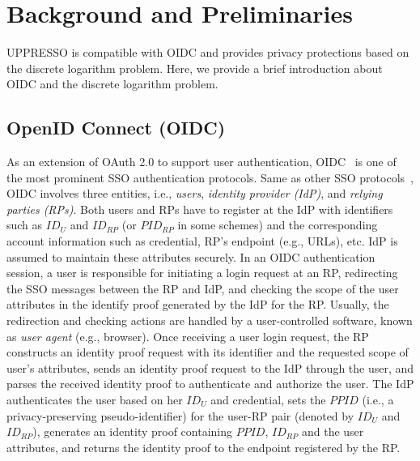 \section{Background and Preliminaries}
\label{sec:background}
UPPRESSO is compatible with OIDC and provides privacy protections based on the discrete logarithm problem.
Here, we provide a brief introduction about OIDC and the discrete logarithm problem.

\subsection{OpenID Connect (OIDC)}
\label{subsec:OIDC}
As an extension of OAuth 2.0 to support user authentication, OIDC~\cite{OpenIDConnect} is one of the most prominent SSO authentication protocols. Same as other SSO protocols~\cite{SAMLIdentifier}, OIDC involves three entities, i.e., {\em users}, {\em identity provider (IdP)}, and {\em relying parties (RPs)}.
Both users and RPs have to register at the IdP with identifiers such as $ID_U$ and $ID_{RP}$ (or $PID_{RP}$ in some schemes) and the corresponding account information such as credential, RP's endpoint (e.g., URLs), etc.
IdP is assumed to maintain these attributes securely. In an OIDC authentication session, a user is responsible for initiating a login request at an RP, redirecting the SSO messages between the RP and IdP, and checking the scope of the user attributes in the identify proof generated by the IdP for the RP. Usually, the redirection and checking actions are handled by a user-controlled software, known as {\em user agent} (e.g., browser). Once receiving a user login request, the RP constructs an identity proof request with its identifier and the requested scope of  user's attributes, sends an identity proof request to the IdP through the user, and parses the received identity proof to authenticate and authorize the user. The IdP authenticates the user based on her $ID_U$ and credential, sets the $PPID$ (i.e., a privacy-preserving pseudo-identifier) for the user-RP pair (denoted by $ID_U$ and $ID_{RP}$), generates an identity proof containing $PPID$, $ID_{RP}$ and the user attributes, and returns the identity proof to the endpoint registered by the RP.

